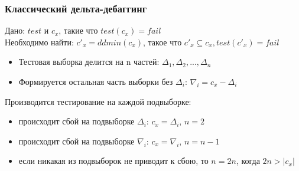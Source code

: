 \begin{frame}
	\small
	\frametitle{Классический дельта-дебаггинг}
	Дано: $test$ и $c_x$, такие что $test(c_x) = fail$ \\
	Необходимо найти: $c'_x = ddmin(c_x)$, такое что $c'_x \subseteq c_x, test(c'_x) = fail$ \\
	\begin{itemize}
		\item Тестовая выборка делится на n частей: $\Delta_1, \Delta_2, ..., \Delta_n$
		\item Формируется остальная часть выборки без $\Delta_i$: $\nabla_i = c_x - \Delta_i$
	\end{itemize}
	Производится тестирование на каждой подвыборке:
	\begin{itemize}
		\item происходит сбой на подвыборке $\Delta_i$: $c_x = \Delta_i$, $n = 2$
		\item происходит сбой на подвыборке $\nabla_i$: $c_x = \nabla_i$, $n = n - 1$
		\item если никакая из подвыборок не приводит к сбою, то $n = 2n$, когда $2n > |c_x|$
	\end{itemize}
\end{frame}


